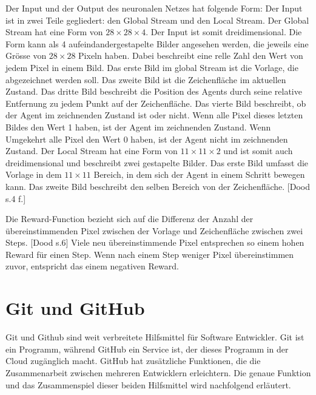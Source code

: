 Der Input und der Output des neuronalen Netzes hat folgende Form: Der Input ist
in zwei Teile gegliedert: den Global Stream und den Local Stream. 
Der Global Stream hat eine Form von $28\times28\times4$. Der Input ist somit
dreidimensional. Die Form kann als 4 aufeindandergestapelte Bilder angesehen
werden, die jeweils eine Grösse von $28\times28$ Pixeln haben. Dabei beschreibt
eine relle Zahl den Wert von jedem Pixel in einem Bild. Das erste Bild im global
Stream ist die Vorlage, die abgezeichnet werden soll. Das zweite Bild ist die
Zeichenfläche im aktuellen Zustand. Das dritte Bild beschreibt die Position des
Agents durch seine relative Entfernung zu jedem Punkt auf der Zeichenfläche. Das
vierte Bild beschreibt, ob der Agent im zeichnenden Zustand ist oder nicht. Wenn
alle Pixel dieses letzten Bildes den Wert 1 haben, ist der Agent im zeichnenden
Zustand. Wenn Umgekehrt alle Pixel den Wert 0 haben, ist der Agent nicht im
zeichnenden Zustand. 
Der Local Stream hat eine Form von $11\times11\times2$ und ist somit auch
dreidimensional und beschreibt zwei gestapelte Bilder. Das erste Bild umfasst
die Vorlage in dem $11\times11$ Bereich, in dem sich der Agent in einem Schritt
bewegen kann. Das zweite Bild beschreibt den selben Bereich von der Zeichenfläche. [Dood s.4 f.]

Die Reward-Function bezieht sich auf die Differenz der Anzahl der
übereinstimmenden Pixel zwischen der Vorlage und Zeichenfläche zwischen zwei
Steps. [Dood s.6] Viele neu übereinstimmende Pixel entsprechen so einem hohen Reward für
einen Step. Wenn nach einem Step weniger Pixel übereinstimmen zuvor, entspricht
das einem negativen Reward. 

\section{Git und GitHub}
\label{chap:git_github}
Git und Github sind weit verbreitete Hilfsmittel für Software Entwickler. Git
ist ein Programm, während GitHub ein Service ist, der dieses Programm in der
Cloud zugänglich macht. GitHub hat zusätzliche Funktionen, die die Zusammenarbeit
zwischen mehreren Entwicklern erleichtern. Die genaue Funktion und das
Zusammenspiel dieser beiden Hilfsmittel wird nachfolgend erläutert.

